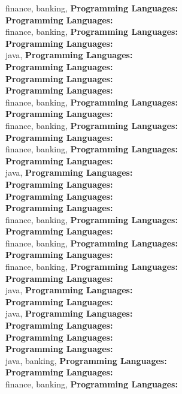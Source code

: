 finance, banking, \textbf{Programming Languages:} \\
\textbf{Programming Languages:} \\
finance, banking, \textbf{Programming Languages:} \\
\textbf{Programming Languages:} \\
java, \textbf{Programming Languages:} \\
\textbf{Programming Languages:} \\
\textbf{Programming Languages:} \\
\textbf{Programming Languages:} \\
finance, banking, \textbf{Programming Languages:} \\
\textbf{Programming Languages:} \\
finance, banking, \textbf{Programming Languages:} \\
\textbf{Programming Languages:} \\
finance, banking, \textbf{Programming Languages:} \\
\textbf{Programming Languages:} \\
java, \textbf{Programming Languages:} \\
\textbf{Programming Languages:} \\
\textbf{Programming Languages:} \\
\textbf{Programming Languages:} \\
finance, banking, \textbf{Programming Languages:} \\
\textbf{Programming Languages:} \\
finance, banking, \textbf{Programming Languages:} \\
\textbf{Programming Languages:} \\
finance, banking, \textbf{Programming Languages:} \\
\textbf{Programming Languages:} \\
java, \textbf{Programming Languages:} \\
\textbf{Programming Languages:} \\
java, \textbf{Programming Languages:} \\
\textbf{Programming Languages:} \\
\textbf{Programming Languages:} \\
\textbf{Programming Languages:} \\
java, banking, \textbf{Programming Languages:} \\
\textbf{Programming Languages:} \\
finance, banking, \textbf{Programming Languages:} \\
